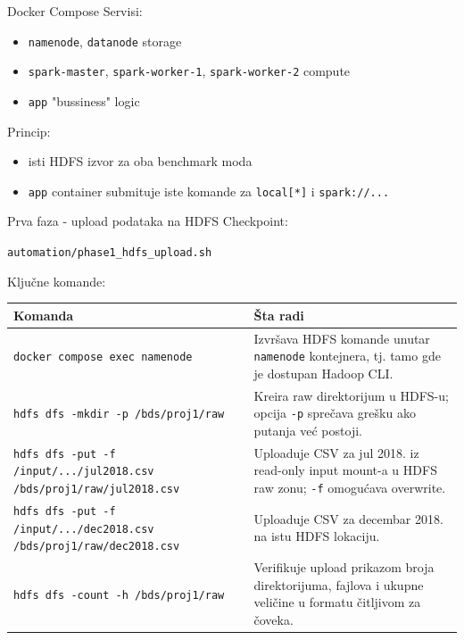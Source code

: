 \documentclass[aspectratio=169,11pt]{beamer}
\newcommand{\code}[1]{\texttt{\small #1}}
\begin{document}
\begin{frame}{Docker Compose}
  Servisi:
  \begin{itemize}
    \item \code{namenode}, \code{datanode} \Rightarrow \space storage
    \item \code{spark-master}, \code{spark-worker-1}, \code{spark-worker-2} \Rightarrow \space compute
    \item \code{app} \Rightarrow \space "bussiness" logic
  \end{itemize}

  \vspace{0.35cm}
  Princip:
  \begin{itemize}
    \item isti HDFS izvor za oba benchmark moda
    \item \code{app} container submituje iste komande za \code{local[*]} i \code{spark://...}
  \end{itemize}
\end{frame}

\begin{frame}[fragile]{Prva faza - upload podataka na HDFS}
  Checkpoint:
  \begin{center}
	\code{automation/phase1\_hdfs\_upload.sh}
  \end{center}

  Ključne komande:
  \vspace{0.15cm}
  \scriptsize
  \begin{tabular}{p{}p{}}
    \toprule
    Komanda & Šta radi \\
    \midrule
    \code{docker compose exec namenode} &
    Izvršava HDFS komande unutar \code{namenode} kontejnera, tj. tamo gde je dostupan Hadoop CLI. \\
    \code{hdfs dfs -mkdir -p /bds/proj1/raw} &
    Kreira raw direktorijum u HDFS-u; opcija \code{-p} sprečava grešku ako putanja već postoji. \\
    \code{hdfs dfs -put -f /input/.../jul2018.csv /bds/proj1/raw/jul2018.csv} &
    Uploaduje CSV za jul 2018. iz read-only input mount-a u HDFS raw zonu; \code{-f} omogućava overwrite. \\
    \code{hdfs dfs -put -f /input/.../dec2018.csv /bds/proj1/raw/dec2018.csv} &
    Uploaduje CSV za decembar 2018. na istu HDFS lokaciju. \\
    \code{hdfs dfs -count -h /bds/proj1/raw} &
    Verifikuje upload prikazom broja direktorijuma, fajlova i ukupne veličine u formatu čitljivom za čoveka. \\
    \bottomrule
  \end{tabular}
  \normalsize
\end{frame}
\end{document}
